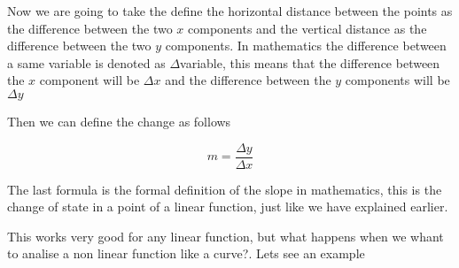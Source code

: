 \documentclass[12pt,journal]{IEEEtran}
\begin{document}
    Now we are going to take the define the horizontal distance between the points
    as the difference between the two $x$ components and the vertical distance as
    the difference between the two $y$ components. In mathematics the difference
    between a same variable is denoted as $\Delta$variable, this means that the
    difference between the $x$ component will be $\Delta x$ and the difference
    between the $y$ components will be $\Delta y$\\


    Then we can define the change as follows

    \begin{equation}
        m = \frac{\Delta y}{\Delta x}
    \end{equation}

    The last formula is the formal definition of the slope in mathematics, this
    is the change of state in a point of a linear function, just like we have
    explained earlier.

    This works very good for any linear function, but what happens when we
    whant to analise a non linear function like a curve?. Lets see an example

\end{document}
